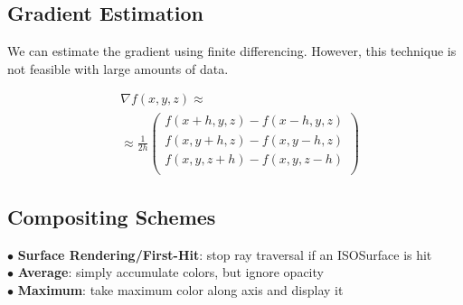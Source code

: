 \subsection{Gradient Estimation}
We can estimate the gradient using finite differencing. However, this technique is not feasible with large amounts of data.

\begin{align*}
    & \nabla f(x, y, z) \approx \\
    & \approx \frac{1}{2h} \begin{pmatrix}
        f(x + h, y, z) - f(x - h, y, z) \\
        f(x, y + h, z) - f(x, y - h, z) \\
        f(x, y, z + h) - f(x, y, z - h) \\
    \end{pmatrix}
\end{align*}

\subsection{Compositing Schemes}
$\bullet$ \textbf{Surface Rendering/First-Hit}: stop ray traversal if an ISOSurface is hit \\
$\bullet$ \textbf{Average}: simply accumulate colors, but ignore opacity \\
$\bullet$ \textbf{Maximum}: take maximum color along axis and display it